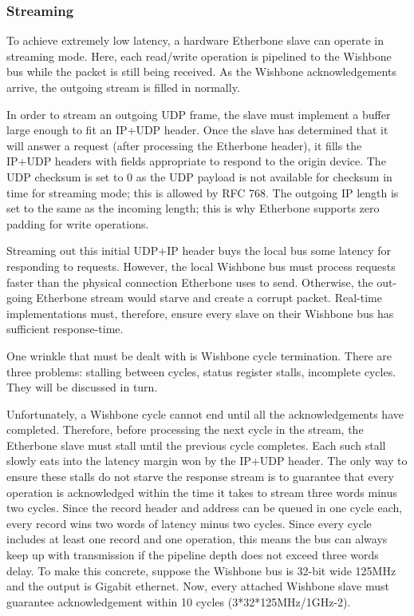 \documentclass{article}
\begin{document}
\subsubsection{Streaming}
\label{sec:cut}

To achieve extremely low latency,
a hardware Etherbone slave can operate in streaming mode.
Here, 
each read/write operation is pipelined to the Wishbone bus
while the packet is still being received.
As the Wishbone acknowledgements arrive,
the outgoing stream is filled in normally.

In order to stream an outgoing UDP frame,
the slave must implement a buffer large enough to fit an IP+UDP header.
Once the slave has determined that it will answer a request
(after processing the Etherbone header),
it fills the IP+UDP headers with fields appropriate 
to respond to the origin device.
The UDP checksum is set to 0 as the UDP payload is not available for
checksum in time for streaming mode;
this is allowed by RFC 768.
The outgoing IP length is set to the same as the incoming length;
this is why Etherbone supports zero padding for write operations.

Streaming out this initial UDP+IP header buys the local bus some 
latency for responding to requests.
However, the local Wishbone bus must process requests faster than the
physical connection Etherbone uses to send.
Otherwise, the out-going Etherbone stream would starve and create a 
corrupt packet.
Real-time implementations must, therefore, 
ensure every slave on their Wishbone bus has sufficient response-time.

One wrinkle that must be dealt with is Wishbone cycle termination.
There are three problems: 
stalling between cycles, 
status register stalls,
incomplete cycles.
They will be discussed in turn.

Unfortunately, a Wishbone cycle cannot end until all the acknowledgements
have completed.
Therefore,
before processing the next cycle in the stream,
the Etherbone slave must stall until the previous cycle completes.
Each such stall slowly eats into the latency margin 
won by the IP+UDP header.
The only way to ensure these stalls do not starve the response stream
is to guarantee that every operation is acknowledged within the time
it takes to stream three words minus two cycles.
Since the record header and address can be queued in one cycle each,
every record wins two words of latency minus two cycles.
Since every cycle includes at least one record and one operation,
this means the bus can always keep up with transmission if
the pipeline depth does not exceed three words delay.
To make this concrete,
suppose the Wishbone bus is 32-bit wide 125MHz and 
the output is Gigabit ethernet.
Now, every attached Wishbone slave must 
guarantee acknowledgement within 10 cycles
(3*32*125MHz/1GHz-2).
\end{document}

